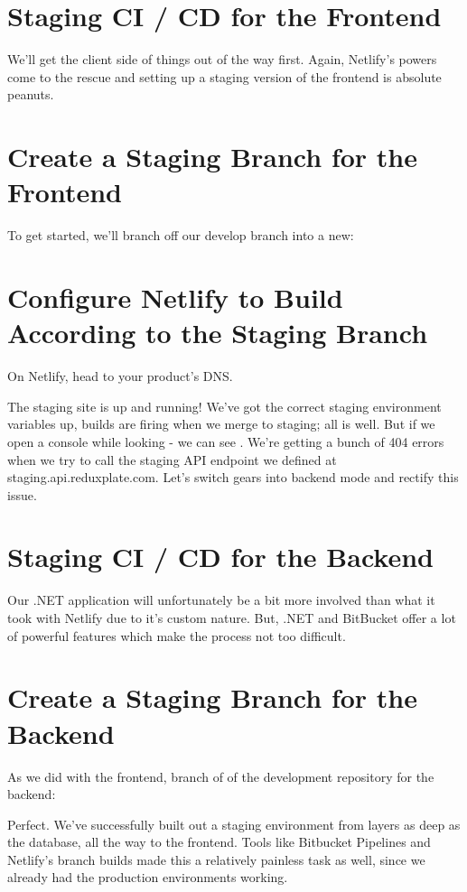 \documentclass[paper=6in:9in,pagesize=pdftex,headinclude=on,footinclude=on,12pt,twoside]{scrbook}
\begin{document}
\section{Staging CI / CD for the Frontend}

We'll get the client side of things out of the way first. Again, Netlify's powers come to the rescue and setting up a staging version of the frontend is absolute peanuts. 

\section{Create a Staging Branch for the Frontend}

To get started, we'll branch off our develop branch into a new:

\section{Configure Netlify to Build According to the Staging Branch}

On Netlify, head to your product's DNS.

The staging site is up and running! We've got the correct staging environment variables up, builds are firing when we merge to staging; all is well. But if we open a console while looking - we can see . We're getting a bunch of 404 errors when we try to call the staging API endpoint we defined at staging.api.reduxplate.com. Let's switch gears into backend mode and rectify this issue.

\section{Staging CI / CD for the Backend}

Our .NET application will unfortunately be a bit more involved than what it took with Netlify due to it's custom nature. But, .NET and BitBucket offer a lot of powerful features which make the process not too difficult.

\section{Create a Staging Branch for the Backend}

As we did with the frontend, branch of of the development repository for the backend:


Perfect. We've successfully built out a staging environment from layers as deep as the database, all the way to the frontend. Tools like Bitbucket Pipelines and Netlify's branch builds made this a relatively painless task as well, since we already had the production environments working.
\end{document}
